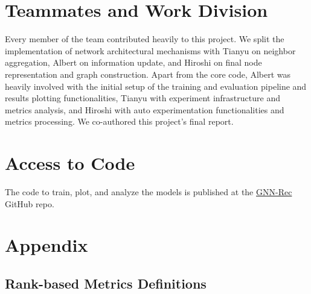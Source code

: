 \documentclass{article}
\begin{document}
\section{Teammates and Work Division}


Every member of the team contributed heavily to this project. We split the implementation of network architectural mechanisms with Tianyu on neighbor aggregation, Albert on information update, and Hiroshi on final node representation and graph construction. Apart from the core code, Albert was heavily involved with the initial setup of the training and evaluation pipeline and results plotting functionalities, Tianyu with experiment infrastructure and metrics analysis, and Hiroshi with auto experimentation functionalities and metrics processing. We co-authored this project's final report.

\section{Access to Code}


The code to train, plot, and analyze the models is published at the \href{https://github.com/thisisalbertliang/gnn-rec}{GNN-Rec} GitHub repo.

\newpage

\section{Appendix}

\subsection{Rank-based Metrics Definitions} \label{rank-metrics-def}
\end{document}
